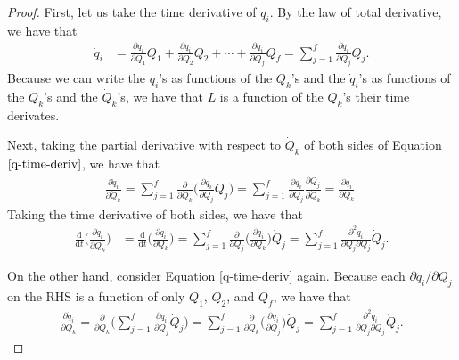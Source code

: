 \documentclass[10pt]{article}
\newcommand{\dee}{\mathrm{d}}
\begin{document}
\begin{itemize}
  	\begin{proof}
  		First, let us take the time derivative of $q_i$. By the law of total derivative, we have that
  		\begin{align} \label{q-time-deriv}
  			\dot{q}_i 
  			&= \frac{\partial q_i}{\partial Q_1} \dot{Q}_1 + \frac{\partial q_i}{\partial Q_2} \dot{Q}_2 + \dotsb + \frac{\partial q_i}{\partial Q_f} \dot{Q}_f
  			= \sum_{j=1}^f \frac{\partial q_i}{\partial Q_j} \dot{Q}_j.
  		\end{align}
  		Because we can write the $q_i$'s as functions of the $Q_k$'s and the $\dot{q}_i$'s as functions of the $Q_k$'s and the $\dot{Q}_k$'s, we have that $L$ is a function of the $Q_k$'s their time derivates.

  		Next, taking the partial derivative with respect to $\dot{Q}_k$ of both sides of Equation $\eqref{q-time-deriv}$, we have that
  		\begin{align} \label{dropping-dots}
  			\frac{\partial \dot{q}_i}{\partial \dot{Q}_k} 
  			= \sum_{j=1}^f \frac{\partial}{\partial \dot{Q}_k} \bigg( \frac{\partial q_i}{\partial Q_j} \dot{Q}_j \bigg)
  			= \sum_{j=1}^f \frac{\partial q_i}{\partial Q_j} \frac{\partial \dot{Q}_j }{\partial \dot{Q}_k}
  			= \frac{\partial q_i}{\partial Q_k}.
  		\end{align}
  		Taking the time derivative of both sides, we have that 
  		\begin{align} \label{dot-q-by-dot-big-Q}
  			\frac{\dee}{\dee t}\bigg( \frac{\partial \dot{q}_i}{\partial \dot{Q}_k}  \bigg)
  			&= \frac{\dee}{\dee t}\bigg( \frac{\partial q_i}{\partial Q_k}  \bigg)
  			= \sum_{j=1}^f \frac{\partial}{\partial Q_j} \bigg( \frac{\partial q_i}{\partial Q_k} \bigg) \dot{Q}_j
  			= \sum_{j=1}^f \frac{\partial^2 q_i}{\partial Q_j \partial Q_j} \dot{Q}_j.
  		\end{align}

  		On the other hand, consider Equation \eqref{q-time-deriv} again. Because each $\partial q_i / \partial Q_j$ on the RHS is a function of only $Q_1$, $Q_2$, and $Q_f$, we have that
  		\begin{align} \label{dot-q-by-big-q}
  		\frac{\partial \dot{q}_i}{\partial Q_k}
  		= \frac{\partial}{\partial Q_k} \bigg( \sum_{j=1}^f \frac{\partial q_i}{\partial Q_j} \dot{Q}_j \bigg)
  		= \sum_{j=1}^f \frac{\partial}{\partial Q_k} \bigg( \frac{\partial q_i}{\partial Q_j} \bigg) \dot{Q}_j
  		= \sum_{j=1}^f \frac{\partial^2 q_i}{\partial Q_j \partial Q_j} \dot{Q}_j.
  		\end{align}


\end{proof}
\end{itemize}
\end{document}
